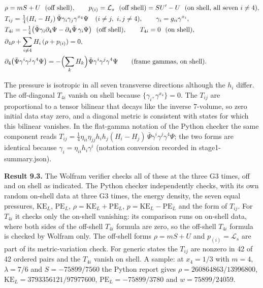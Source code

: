 \documentclass[11pt]{article}
\begin{document}
\[
\begin{aligned}
&\rho=mS+U\ \ (\text{off shell}),\qquad p_{(i)}=\mathcal L_s\ \ (\text{off shell})=SU'-U\ \ (\text{on shell, all seven }i\ne4),\\
&T_{ij}=\tfrac14(H_i-H_j)\,\bar\Psi\gamma_i\gamma_j\gamma^{x_4}\Psi\quad(i\ne j,\ i,j\ne4),\qquad \gamma_i=g_{ii}\gamma^{x_i},\\
&T_{4i}=-\tfrac14\bigl(\bar\Psi\gamma_i\partial_4\Psi-\partial_4\bar\Psi\,\gamma_i\Psi\bigr)\ \ (\text{off shell}),\qquad T_{4i}=0\ \ (\text{on shell}),\\
&\partial_4\rho+\sum_{i\ne4}H_i\,(\rho+p_{(i)})=0,\\
&\partial_4\bigl(\bar\Psi\gamma^i\gamma^j\gamma^4\Psi\bigr)=-\Bigl(\sum_kH_k\Bigr)\bar\Psi\gamma^i\gamma^j\gamma^4\Psi\qquad(\text{frame gammas, on shell}).
\end{aligned}
\]

The pressure is isotropic in all seven transverse directions although the $h_i$ differ. The off-diagonal $T_{4i}$ vanish on shell because $\{\gamma_i,\gamma^{x_4}\}=0$. The $T_{ij}$ are proportional to a tensor bilinear that decays like the inverse 7-volume, so zero initial data stay zero, and a diagonal metric is consistent with states for which this bilinear vanishes. In the flat-gamma notation of the Python checker the same component reads $T_{ij}=\tfrac14\eta_{ii}\eta_{jj}h_ih_j(H_i-H_j)\,\bar\Psi\gamma^i\gamma^j\gamma^4\Psi$; the two forms are identical because $\gamma_i=\eta_{ii}h_i\gamma^i$ (notation conversion recorded in stage1-summary.json).

\textbf{Result 9.3.} The Wolfram verifier checks all of these at the three G3 times, off and on shell as indicated. The Python checker independently checks, with its own random on-shell data at three G3 times, the energy density, the seven equal pressures, $\mathrm{KE}_L$, $\mathrm{PE}_L$, $\rho=\mathrm{KE}_L+\mathrm{PE}_L$, $p=\mathrm{KE}_L-\mathrm{PE}_L$ and the form of $T_{ij}$. For $T_{4i}$ it checks only the on-shell vanishing: its comparison runs on on-shell data, where both sides of the off-shell $T_{4i}$ formula are zero, so the off-shell $T_{4i}$ formula is checked by Wolfram only. The off-shell forms $\rho=mS+U$ and $p_{(i)}=\mathcal L_s$ are part of its metric-variation check. For generic states the $T_{ij}$ are nonzero in 42 of 42 ordered pairs and the $T_{4i}$ vanish on shell. A sample: at $x_4=1/3$ with $m=4$, $\lambda=7/6$ and $S=-75899/7560$ the Python report gives $\rho=260864863/13996800$, $\mathrm{KE}_L=3793356121/97977600$, $\mathrm{PE}_L=-75899/3780$ and $w=75899/24059$.
\end{document}
